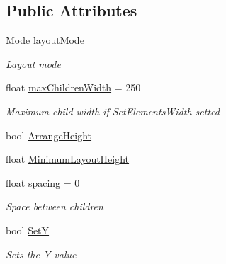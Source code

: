 \subsection*{Public Attributes}
\begin{DoxyCompactItemize}
\item 
\hyperlink{class_simple_horizontal_layout_a84c3989f969567fef94985df15d7d03f}{Mode} \hyperlink{class_simple_horizontal_layout_acb490833b59e67c1306b2c8d7aba534a}{layout\+Mode}
\begin{DoxyCompactList}\small\item\em Layout mode \end{DoxyCompactList}\item 
float \hyperlink{class_simple_horizontal_layout_a3e305d4ee78354f8ce8650c5409c358d}{max\+Children\+Width} = 250
\begin{DoxyCompactList}\small\item\em Maximum child width if Set\+Elements\+Width setted \end{DoxyCompactList}\item 
bool \hyperlink{class_simple_horizontal_layout_afd08bf7970a6d9e82943384e44ef8339}{Arrange\+Height}
\item 
float \hyperlink{class_simple_horizontal_layout_a360ce2c814e5fcb8f8e352578608bd32}{Minimum\+Layout\+Height}
\item 
float \hyperlink{class_simple_horizontal_layout_ab0fb3dccf8a62c18d489c17cc5ac1521}{spacing} = 0
\begin{DoxyCompactList}\small\item\em Space between children \end{DoxyCompactList}\item 
bool \hyperlink{class_simple_horizontal_layout_a40dbd72e1ea4e2924300162e5ca4d409}{SetY}
\begin{DoxyCompactList}\small\item\em Sets the Y value \end{DoxyCompactList}\end{DoxyCompactItemize}
